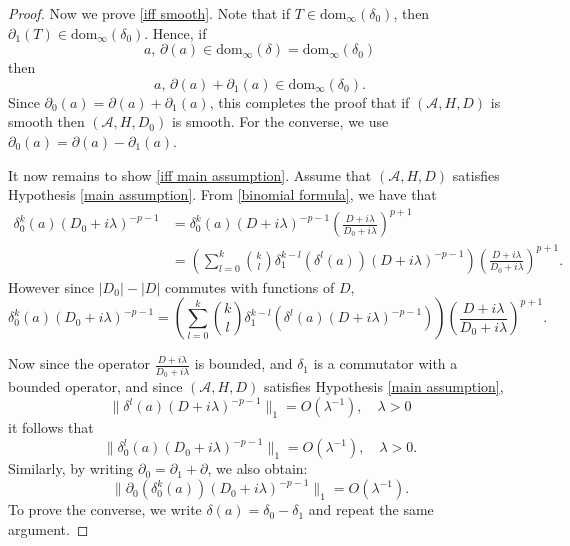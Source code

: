 \begin{proof}
        Now we prove \eqref{iff smooth}. Note that if $T \in \mathrm{dom}_\infty(\delta_0)$, then $\partial_1(T) \in \mathrm{dom}_\infty(\delta_0)$. Hence, if
        \begin{equation*}
            a,\, \partial(a) \in \mathrm{dom}_\infty(\delta) = \mathrm{dom}_\infty(\delta_0)
        \end{equation*}
        then
        \begin{equation*}
            a,\, \partial(a)+\partial_1(a) \in \mathrm{dom}_\infty(\delta_0).
        \end{equation*}
        Since $\partial_0(a) = \partial(a)+\partial_1(a)$, this completes the proof that if $(\mathcal{A},H,D)$ is smooth then $(\mathcal{A},H,D_0)$ is smooth.
        For the converse, we use $\partial_0(a) = \partial(a)-\partial_1(a)$.
        

        It now remains to show \eqref{iff main assumption}. Assume that $(\mathcal{A},H,D)$ satisfies
        Hypothesis \ref{main assumption}. From \eqref{binomial formula}, we have that
        \begin{align*}
            \delta_0^k(a)(D_0+i\lambda)^{-p-1} &= \delta_0^k(a)(D+i\lambda)^{-p-1}\left(\frac{D+i\lambda}{D_0+i\lambda}\right)^{p+1}\\
                                               &= \left(\sum_{l=0}^k \binom{k}{l} \delta_1^{k-l}(\delta^l(a))(D+i\lambda)^{-p-1}\right)\left(\frac{D+i\lambda}{D_0+i\lambda}\right)^{p+1}.
        \end{align*}
        However since $|D_0|-|D|$ commutes with functions of $D$,
        \begin{equation*}
            \delta_0^k(a)(D_0+i\lambda)^{-p-1} = \left(\sum_{l=0}^k \binom{k}{l} \delta_1^{k-l}(\delta^l(a)(D+i\lambda)^{-p-1})\right)\left(\frac{D+i\lambda}{D_0+i\lambda}\right)^{p+1}.
        \end{equation*}
        
        Now since the operator $\frac{D+i\lambda}{D_0+i\lambda}$ is bounded, and $\delta_1$ is a commutator with a bounded operator, and since $(\mathcal{A},H,D)$ satisfies Hypothesis \ref{main assumption},
        \begin{equation*}
            \|\delta^l(a)(D+i\lambda)^{-p-1}\|_1 = O(\lambda^{-1}), \quad\lambda > 0
        \end{equation*}
        it follows that
        \begin{equation*}
            \|\delta_0^l(a)(D_0+i\lambda)^{-p-1}\|_1 = O(\lambda^{-1}),\quad \lambda > 0.
        \end{equation*}
        Similarly, by writing $\partial_0 = \partial_1+\partial$, we also obtain:
        \begin{equation*}
            \|\partial_0(\delta_0^k(a))(D_0+i\lambda)^{-p-1}\|_1 = O(\lambda^{-1}).
        \end{equation*}
        To prove the converse, we write $\delta(a) = \delta_0-\delta_1$ and repeat the same argument.
    \end{proof}
    
